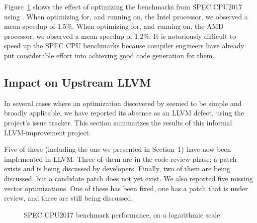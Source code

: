 Figure~\ref{fig:spec} shows the effect of optimizing the benchmarks
from SPEC CPU2017 using \minotaur.
%
When optimizing for, and running on, the Intel processor, we observed
a mean speedup of 1.5\%.
%
When optimizing for, and running on, the AMD processor, we observed a
mean speedup of 1.2\%.
%
It is notoriously difficult to speed up the SPEC CPU benchmarks
because compiler engineers have already put considerable effort into
achieving good code generation for them.



\subsection{Impact on Upstream LLVM}

In several cases where an optimization discovered by \minotaur{} seemed to
be simple and broadly applicable, we have reported its absence as an
LLVM defect, using the project's issue tracker.
%
This section summarizes the results of this informal LLVM-improvement
project.



%
Five of these (including the one we presented in Section~1) have now
been implemented in LLVM\@.
%
Three of them are in the code review phase: a patch exists and is
being discussed by developers.
%
Finally, two of them are being discussed, but a candidate patch does
not yet exist.
We also reported five missing vector optimizations.
%
One of these has been fixed, one has a patch that is under review, and
three are still being discussed.

\begin{figure}[tbp]
  \centering
  \hfill
  \caption{SPEC CPU2017 benchmark performance, on a logarithmic scale.}
  \label{fig:spec}
\end{figure}

